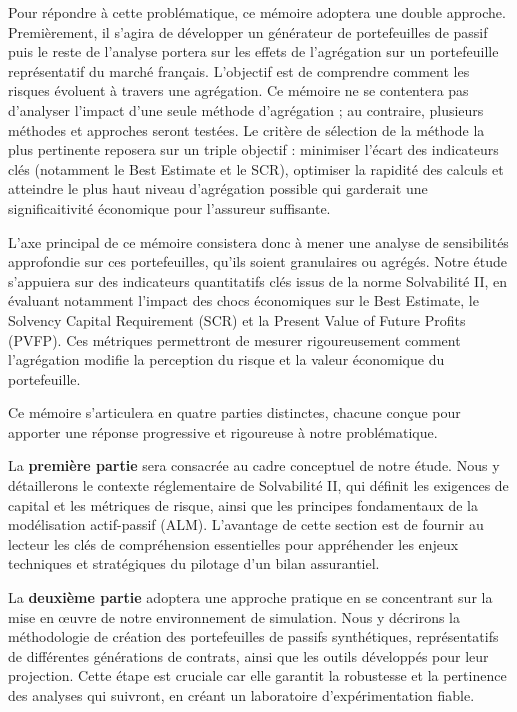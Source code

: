 Pour répondre à cette problématique, ce mémoire adoptera une double approche. Premièrement, il s'agira de développer un générateur de portefeuilles de passif puis le reste de l'analyse portera sur les effets de l'agrégation sur un portefeuille représentatif du marché français. L'objectif est de comprendre comment les risques évoluent à travers une agrégation. Ce mémoire ne se contentera pas d'analyser l'impact d'une seule méthode d'agrégation ; au contraire, plusieurs méthodes et approches seront testées. Le critère de sélection de la méthode la plus pertinente reposera sur un triple objectif : minimiser l'écart des indicateurs clés (notamment le Best Estimate et le SCR), optimiser la rapidité des calculs et atteindre le plus haut niveau d'agrégation possible qui garderait une significaitivité économique pour l'assureur suffisante.

L'axe principal de ce mémoire consistera donc à mener une analyse de sensibilités approfondie sur ces portefeuilles, qu'ils soient granulaires ou agrégés. Notre étude s'appuiera sur des indicateurs quantitatifs clés issus de la norme Solvabilité II, en évaluant notamment l'impact des chocs économiques sur le Best Estimate, le Solvency Capital Requirement (SCR) et la Present Value of Future Profits (PVFP). Ces métriques permettront de mesurer rigoureusement comment l'agrégation modifie la perception du risque et la valeur économique du portefeuille.

Ce mémoire s'articulera en quatre parties distinctes, chacune conçue pour apporter une réponse progressive et rigoureuse à notre problématique.


La \textbf{première partie} sera consacrée au cadre conceptuel de notre étude. Nous y détaillerons le contexte réglementaire de Solvabilité II, qui définit les exigences de capital et les métriques de risque, ainsi que les principes fondamentaux de la modélisation actif-passif (ALM). L'avantage de cette section est de fournir au lecteur les clés de compréhension essentielles pour appréhender les enjeux techniques et stratégiques du pilotage d'un bilan assurantiel.


La \textbf{deuxième partie} adoptera une approche pratique en se concentrant sur la mise en œuvre de notre environnement de simulation. Nous y décrirons la méthodologie de création des portefeuilles de passifs synthétiques, représentatifs de différentes générations de contrats, ainsi que les outils développés pour leur projection. Cette étape est cruciale car elle garantit la robustesse et la pertinence des analyses qui suivront, en créant un laboratoire d'expérimentation fiable.


